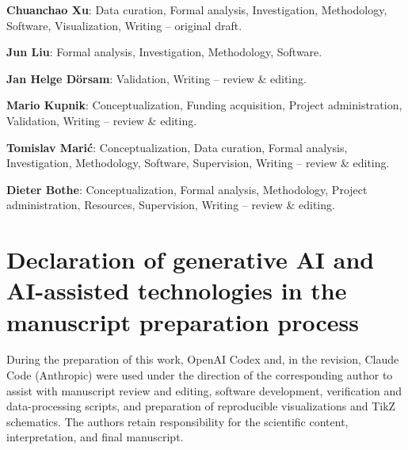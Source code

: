 \documentclass[final,12pt,nopreprintline,longtitle]{elsarticle}
\newcommand{\paperbibliography}[1]{}
\begin{document}
\noindent\textbf{Chuanchao Xu}: Data curation, Formal analysis, Investigation, Methodology, Software, Visualization, Writing -- original draft.

\noindent\textbf{Jun Liu}: Formal analysis, Investigation, Methodology, Software.

\noindent\textbf{Jan Helge Dörsam}: Validation, Writing -- review \& editing.

\noindent\textbf{Mario Kupnik}: Conceptualization, Funding acquisition, Project administration, Validation, Writing -- review \& editing.

\noindent\textbf{Tomislav Mari\'{c}}: Conceptualization, Data curation, Formal analysis, Investigation, Methodology, Software, Supervision, Writing -- review \& editing.

\noindent\textbf{Dieter Bothe}: Conceptualization, Formal analysis, Methodology, Project administration, Resources, Supervision, Writing -- review \& editing.

\section*{Declaration of generative AI and AI-assisted technologies in the manuscript preparation process}

During the preparation of this work, OpenAI Codex and, in the revision,
Claude Code (Anthropic) were used under the direction of the corresponding
author to assist with manuscript review and editing,
software development, verification and data-processing scripts, and
preparation of reproducible visualizations and TikZ schematics.  The
authors retain responsibility for the scientific content, interpretation,
and final manuscript.


\paperbibliography{bibliography-cpc-revision}
\end{document}
